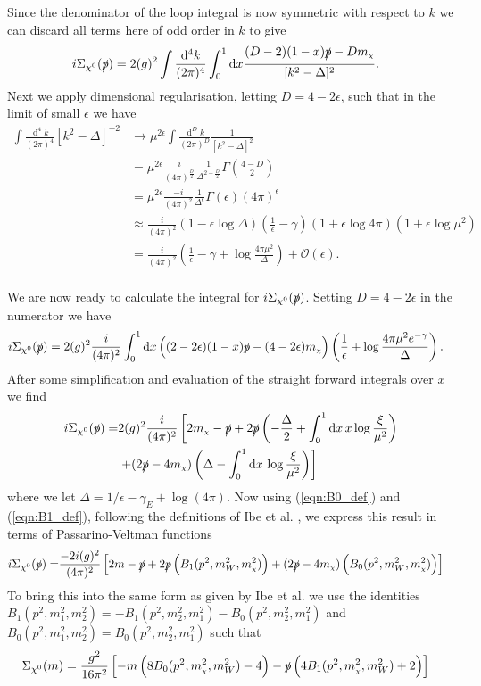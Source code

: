 \documentclass[11pt]{article}
\newcommand{\mychi}{\raisebox{0pt}[1ex][1ex]{\tiny$\chi$}}
\def\sp{\slashed{p}}
\def\cn{\chi^0}
\renewcommand{\d}{\ensuremath{\operatorname{d}\!}}
\def\mc{m_{\mychi}}
\begin{document}
Since the denominator of the loop integral is now symmetric with respect to $k$ we can discard all terms here of odd order in $k$ to give
\begin{align}
i\Sigma_{\cn}(\slashed{p})&= 2(g)^2 \int \frac{\d^4k}{(2\pi)^4}\int_0^1 \d x \frac{(D-2)(1-x)\sp-D\mc}{[ k^2-\Delta]^2}.
\end{align}
Next we apply dimensional regularisation, letting $D=4-2\epsilon$, such that in the limit of small $\epsilon$ we have
\begin{align*}
\int \frac{\d^4k}{(2\pi)^4}{[ k^2-\Delta]^{-2}} &\rightarrow  \mu^{2\epsilon}\int \frac{\d^Dk}{(2\pi)^D}  \frac{1}{[ k^2-\Delta]^2}\\
&= \mu^{2\epsilon}\frac{i}{(4\pi)^{\frac{D}{2}}} \frac{1}{\Delta^{2-\frac{D}{2}}} \Gamma\left(\frac{4-D}{2}\right) \\
&= \mu^{2\epsilon}\frac{-i}{(4\pi)^2}\frac{1}{\Delta^{\epsilon}}\Gamma\left(\epsilon\right) (4\pi)^{\epsilon}\\
&\approx \frac{i}{(4\pi)^2} \left( 1-\epsilon\log\Delta\right)\left(\frac{1}{\epsilon}-\gamma\right)\left(1+\epsilon\log 4\pi\right)\left(1+\epsilon\log\mu^2\right)\\
&=\frac{i}{(4\pi)^2} \left(\frac{1}{\epsilon}-\gamma+\log\frac{4\pi\mu^2}{\Delta}\right)+\mathcal{O}(\epsilon).
\end{align*}\\

We are now ready to calculate the integral for $i\Sigma_{\cn}(\slashed{p})$.  Setting $D=4-2\epsilon$ in the numerator we have
\begin{align}
i\Sigma_{\cn}(\slashed{p})&= 2 (g)^2 \frac{i}{(4\pi)^2}  \int_0^1 \d x \left( (2-2\epsilon)(1-x)\sp-(4-2\epsilon)\mc  \right) \left(\frac{1}{\epsilon}+\log\frac{4\pi\mu^2e^{-\gamma}}{\Delta}\right).
\end{align}
After some simplification and evaluation of the straight forward integrals over $x$ we find
\begin{align}
i\Sigma_{\cn}(\slashed{p})=& 2 (g)^2 \frac{i}{(4\pi)^2} \left[ 2\mc-\sp + 2\sp\left(-\frac{\Delta}{2}+\int_0^1\d x \, x \log\frac{\xi}{\mu^2}\right)\right. \\
&\left. + (2\sp-4\mc)\left(\Delta-\int_0^1\d x\, \log\frac{\xi}{\mu^2}\right)\right]
\end{align}
where we let $\Delta = 1/\epsilon-\gamma_E+\log(4\pi)$.  Now using (\ref{eqn:B0_def}) and (\ref{eqn:B1_def}), following the definitions of Ibe et al. \cite{Ibe2013a}, we express this result in terms of Passarino-Veltman functions
\begin{align}
i\Sigma_{\cn}(\slashed{p})=& \frac{-2i (g)^2}{(4\pi)^2} \left[ 2m-\sp + 2\sp\left(B_1(p^2,m_W^2,\mc^2)\right) + (2\sp-4\mc)\left(B_0(p^2,m_W^2,\mc^2)\right)\right]
\end{align}
To bring this into the same form as given by Ibe et al. \cite{Ibe2013a} we use the identities $B_1(p^2,m_1^2,m_2^2)=-B_1(p^2,m_2^2,m_1^2)-B_0(p^2,m_2^2,m_1^2)$ and $B_0(p^2,m_1^2,m_2^2)=B_0(p^2,m_2^2,m_1^2)$  such that
\begin{align}
\Sigma_{\cn}(m)&= \frac{g^2}{16\pi^2}   \left[ -m\left(8 B_0(p^2,\mc^2,m_W^2)-4\right)-\slashed{p}\left(4 B_1(p^2,\mc^2,m_W^2)+2\right)\right]
\end{align}
\end{document}
